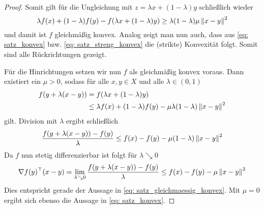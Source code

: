 \documentclass[ %
ngerman, %
a4paper, 
11pt,%
sectionreset, %
chapterstyle=framed, %
sectionstyle=pure, %
titlefont=osfamily %
]{../texmf/tex/latex/mathscriptMathTUD/mathscriptMathTUD}
\begin{document}
\begin{proof}
	Somit gilt für die Ungleichung mit $z = \lambda x + (1-\lambda) y$ schließlich wieder
	\begin{equation*}
		\lambda f(x) + (1-\lambda) f(y) - f(\lambda x + (1-\lambda) y) \geq \lambda (1-\lambda) \mu \left\lVert x-y \right\rVert^2
	\end{equation*}
	und damit ist $f$ gleichmäßig konvex. Analog zeigt man nun auch, dass aus \eqref{eq: satz_konvex} bzw. \eqref{eq: satz_streng_konvex} die (strikte) Konvexität folgt. Somit sind alle Rückrichtungen gezeigt.
	
	Für die Hinrichtungen setzen wir nun $f$ als gleichmäßig konvex voraus. Dann existiert ein $\mu > 0$, sodass für alle $x,y \in X$ und alle $\lambda \in (0,1)$
	\begin{equation*}
	\begin{aligned}
		f(y + \lambda(x-y)) 
		&= f(\lambda x + (1-\lambda) y) \\
		&\leq \lambda f(x) + (1-\lambda) f(y) - \mu \lambda (1-\lambda) \left\lVert x-y \right\rVert^2
	\end{aligned}
	\end{equation*}
	gilt. Division mit $\lambda$ ergibt schließlich
	\begin{align*}
		\frac{f(y + \lambda (x-y)) - f(y)}{\lambda} \leq f(x) - f(y) - \mu (1-\lambda) \left\lVert x-y \right\rVert^2
	\end{align*}
	Da $f$ nun stetig differenzierbar ist folgt für $\lambda \searrow 0$
	\begin{align} \label{eq: proof_differenzieren}
		\nabla f(y)^{\top} (x-y) = \lim_{\lambda \searrow 0} \frac{f(y + \lambda (x-y)) - f(y)}{\lambda} \leq f(x) - f(y) - \mu \left\lVert x-y \right\rVert^2
	\end{align}
	Dies entspricht gerade der Aussage in \eqref{eq: satz_gleichmaessig_konvex}. Mit $\mu = 0$ ergibt sich ebenso die Aussage in \eqref{eq: satz_konvex}.
	
	\pagebreak
	

\end{proof}
\end{document}
